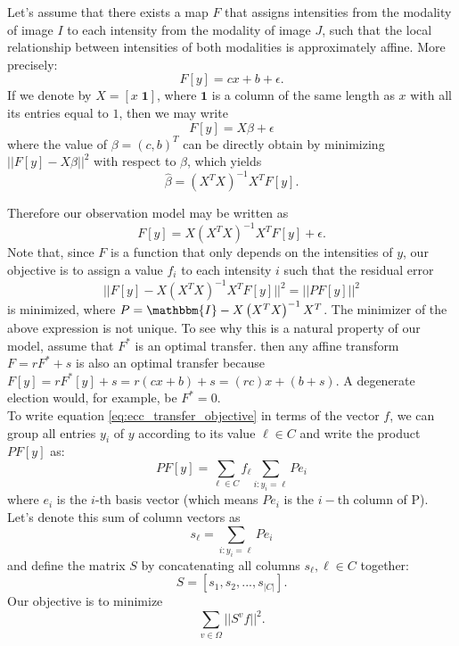 Let's assume that there exists a map $F$ that assigns intensities from the modality of image $I$ to each intensity from the modality of image $J$, such that the local relationship between intensities of both modalities is approximately affine. More precisely:
\begin{equation}
    F[y] = cx + b + \epsilon.
\end{equation}
If we denote by $X = \left[x \; \mathbf{1}\right]$, where $\mathbf{1}$ is a column of the same length as $x$ with all its entries equal to $1$, then we may write
\begin{equation}
    F[y] = X\beta + \epsilon
\end{equation}
where the value of $\beta = \left(c, b\right)^{T}$ can be directly obtain by minimizing $|| F[y] - X\beta||^{2}$ with respect to $\beta$, which yields
\begin{equation}
    \widehat{\beta} = \left(X^{T}X\right)^{-1}X^{T}F[y].
\end{equation}

Therefore our observation model may be written as
\begin{equation}
    F[y] =  X\left(X^{T}X\right)^{-1}X^{T}F[y] + \epsilon.
\end{equation}
Note that, since $F$ is a function that only depends on the intensities of $y$, our objective is to assign a value $f_{i}$ to each intensity $i$ such that the residual error
\begin{equation}\label{eq:ecc_transfer_objective}
    || F[y] - X\left(X^{T}X\right)^{-1}X^{T}F[y]||^{2} = || P F[y]||^{2}
\end{equation}
is minimized, where $P = \mathbbm{I} - X\left(X^{T}X\right)^{-1}X^{T}$. The minimizer of the above expression is not unique. To see why this is a natural property of our model, assume that $F^{*}$ is an optimal transfer. then any affine transform $F = r F^{*} + s$ is also an optimal transfer because $F[y] = r F^{*}[y]+s = r(cx+b)+s = (rc)x + (b+s)$. A degenerate election would, for example, be $F^{*} = 0$.\\

To write equation \eqref{eq:ecc_transfer_objective} in terms of the vector $f$, we can group all entries $y_{i}$ of $y$ according to its value $\ell \in C$ and write the product $P F[y]$ as:
\begin{equation}
    P F[y] = \sum_{\ell \in C} f_{\ell} \sum_{i: y_{i} = \ell} P e_{i}
\end{equation}
where $e_{i}$ is the $i$-th basis vector (which means $P e_{i}$ is the $i-$th column of P). Let's denote this sum of column vectors as
\begin{equation}
    s_{\ell} =  \sum_{i: y_{i} = \ell} P e_{i}
\end{equation}
and define the matrix $S$ by concatenating all columns $s_{\ell}, \ell\in C$ together:
\begin{equation}
    S = [s_{1}, s_{2}, ..., s_{|C|}].
\end{equation}
Our objective is to minimize
\begin{equation}
    \sum_{v \in \Omega} ||S^{v} f||^{2}.
\end{equation}


